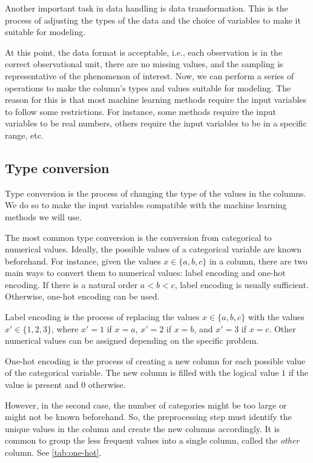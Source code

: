 Another important task in data handling is data transformation.  This is the process of
adjusting the types of the data and the choice of variables to make it suitable for
modeling.

At this point, the data format is acceptable, i.e., each observation is in the correct
observational unit, there are no missing values, and the sampling is representative of the
phenomenon of interest.  Now, we can perform a series of operations to make the
column's types and values suitable for modeling.  The reason for this is that most
machine learning methods require the input variables to follow some restrictions.  For
instance, some methods require the input variables to be real numbers, others require the
input variables to be in a specific range, etc.

\subsection{Type conversion}

Type conversion is the process of changing the type of the values in the columns.  We do
so to make the input variables compatible with the machine learning methods we will use.

The most common type conversion is the conversion from categorical to numerical values.
Ideally, the possible values of a categorical variable are known beforehand.
For instance, given the values $x \in \{a, b, c\}$ in a column, there are two main ways to
convert them to numerical values: label encoding and one-hot encoding.  If there is a
natural order $a < b < c$, label encoding is usually sufficient.  Otherwise, one-hot encoding
can be used.

Label encoding is the process of replacing the values $x \in \{a, b, c\}$ with the values
$x' \in \{1, 2, 3\}$, where $x' = 1$ if $x = a$, $x' = 2$ if $x = b$, and $x' = 3$ if
$x = c$.  Other numerical values can be assigned depending on the specific problem.

One-hot encoding is the process of creating a new column for each possible value
of the categorical variable.  The new column is filled with the logical value $1$ if the
value is present and $0$ otherwise.

However, in the second case, the number of categories might be too large or might not be
known beforehand.  So, the preprocessing step must identify the unique values in the
column and create the new columns accordingly.  It is common to group the less frequent
values into a single column, called the \emph{other} column.  See \cref{tab:one-hot}.

